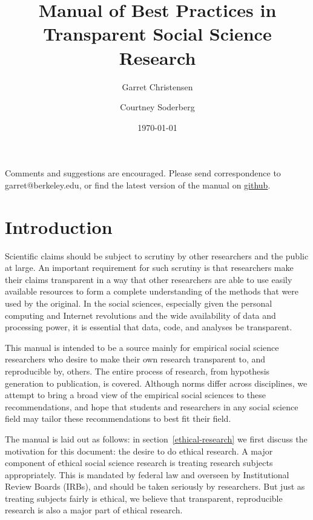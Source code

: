 \documentclass[12pt] {article}
\begin{document}
\title{Manual of Best Practices in Transparent Social Science Research}

\author[1]{Garret Christensen}
\author[2]{Courtney Soderberg}
\date{\today}
\maketitle

\begin{center}
Comments and suggestions are encouraged. Please send correspondence to garret@berkeley.edu, or find the latest version of the manual on \href{https://github.com/garretchristensen/BestPracticesManual}{github}.
\end{center}

\newpage
\tableofcontents

\newpage
\section{Introduction}\label{introduction}

Scientific claims should be subject to scrutiny by other researchers and
the public at large. An important requirement for such scrutiny is that
researchers make their claims transparent in a way that other
researchers are able to use easily available resources to form a
complete understanding of the methods that were used by the original. In
the social sciences, especially given the personal computing and
Internet revolutions and the wide availability of data and processing
power, it is essential that data, code, and analyses be transparent.

This manual is intended to be a source mainly for empirical social
science researchers who desire to make their own research transparent
to, and reproducible by, others. The entire process of research, from
hypothesis generation to publication, is covered. Although norms differ
across disciplines, we attempt to bring a broad view of the empirical
social sciences to these recommendations, and hope that students and
researchers in any social science field may tailor these recommendations
to best fit their field.

The manual is laid out as follows: in section~\ref{ethical-research} we first discuss the motivation for this document: the
desire to do ethical research. A major component of ethical social
science research is treating research subjects appropriately. This is
mandated by federal law and overseen by Institutional Review Boards
(IRBs), and should be taken seriously by researchers. But just as
treating subjects fairly is ethical, we believe that transparent,
reproducible research is also a major part of ethical research.
\end{document}

